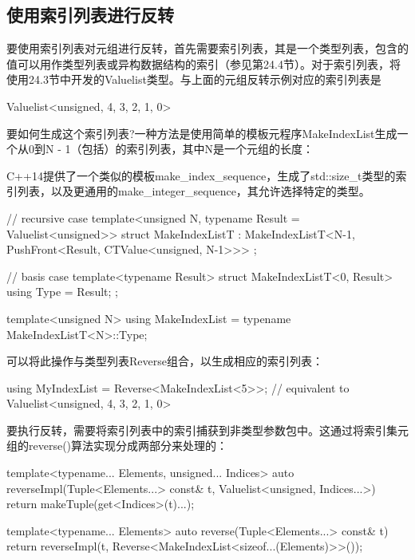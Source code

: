 \subsection{使用索引列表进行反转}

要使用索引列表对元组进行反转，首先需要索引列表，其是一个类型列表，包含的值可以用作类型列表或异构数据结构的索引（参见第24.4节）。对于索引列表，将使用24.3节中开发的Valuelist类型。与上面的元组反转示例对应的索引列表是

\begin{cpp}
Valuelist<unsigned, 4, 3, 2, 1, 0>
\end{cpp}

要如何生成这个索引列表?一种方法是使用简单的模板元程序MakeIndexList生成一个从0到N - 1（包括）的索引列表，其中N是一个元组的长度：

\begin{notice}
C++14提供了一个类似的模板make\_index\_sequence，生成了std::size\_t类型的索引列表，以及更通用的make\_integer\_sequence，其允许选择特定的类型。
\end{notice}

\begin{cpp}
// recursive case
template<unsigned N, typename Result = Valuelist<unsigned>>
struct MakeIndexListT
: MakeIndexListT<N-1, PushFront<Result, CTValue<unsigned, N-1>>> {};

// basis case
template<typename Result>
struct MakeIndexListT<0, Result> {
	using Type = Result;
};

template<unsigned N>
using MakeIndexList = typename MakeIndexListT<N>::Type;
\end{cpp}

可以将此操作与类型列表Reverse组合，以生成相应的索引列表：

\begin{cpp}
using MyIndexList = Reverse<MakeIndexList<5>>;
					// equivalent to Valuelist<unsigned, 4, 3, 2, 1, 0>
\end{cpp}

要执行反转，需要将索引列表中的索引捕获到非类型参数包中。这通过将索引集元组的reverse()算法实现分成两部分来处理的：

\begin{cpp}
template<typename... Elements, unsigned... Indices>
auto reverseImpl(Tuple<Elements...> const& t,
Valuelist<unsigned, Indices...>) {
	return makeTuple(get<Indices>(t)...);
}

template<typename... Elements>
auto reverse(Tuple<Elements...> const& t) {
	return reverseImpl(t,
	Reverse<MakeIndexList<sizeof...(Elements)>>());
}
\end{cpp}


